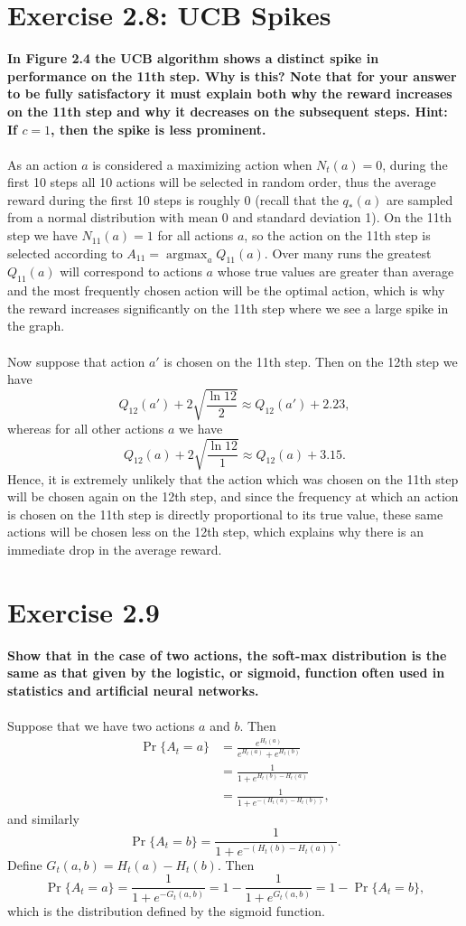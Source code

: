 \documentclass[a4paper,11pt]{article}
\numberwithin{equation}{section}
\theoremstyle{remark}
\DeclareMathOperator*{\argmax}{argmax}
\begin{document}
\section{Exercise 2.8: UCB Spikes}

\textbf{In Figure 2.4 the UCB algorithm shows a distinct spike in performance on the 11th step. Why is this? Note that for your answer to be fully satisfactory it must explain both why the reward increases on the 11th step and why it decreases on the subsequent steps. Hint: If $c = 1$, then the spike is less prominent.}
\\ \\
As an action $a$ is considered a maximizing action when $N_t(a)=0$, during the first 10 steps all 10 actions will be selected in random order, thus the average reward during the first 10 steps is roughly 0 (recall that the $q_*(a)$ are sampled from a normal distribution with mean 0 and standard deviation 1). On the 11th step we have $N_{11}(a)=1$ for all actions $a$, so the action on the 11th step is selected according to $A_{11} = \argmax_a Q_{11}(a)$. Over many runs the greatest $Q_{11}(a)$ will correspond to actions $a$ whose true values are greater than average and the most frequently chosen action will be the optimal action, which is why the reward increases significantly on the 11th step where we see a large spike in the graph.
\\ \\
Now suppose that action $a'$ is chosen on the 11th step. Then on the 12th step we have
\[
	Q_{12}(a') + 2\sqrt{\frac{\ln 12}{2}} \approx 	Q_{12}(a') + 2.23,
\]
whereas for all other actions $a$ we have
\[
Q_{12}(a) + 2\sqrt{\frac{\ln 12}{1}} \approx Q_{12}(a) + 3.15.
\]
Hence, it is extremely unlikely that the action which was chosen on the 11th step will be chosen again on the 12th step, and since the frequency at which an action is chosen on the 11th step is directly proportional to its true value, these same actions will be chosen less on the 12th step, which explains why there is an immediate drop in the average reward.


\section{Exercise 2.9}

\textbf{Show that in the case of two actions, the soft-max distribution is the same as that given by the logistic, or sigmoid, function often used in statistics and artificial neural networks.}
\\ \\
Suppose that we have two actions $a$ and $b$. Then
\begin{align*}
	\Pr\{A_t = a\} & = \frac{e^{H_t(a)}}{e^{H_t(a)} + e^{H_t(b)}} \\
				   & = \frac{1}{1 + e^{H_t(b) - H_t(a)}} \\
				   & = \frac{1}{1 + e^{-(H_t(a) - H_t(b))}},
\end{align*}
and similarly 
\[
	\Pr\{A_t = b\} = \frac{1}{1 + e^{-(H_t(b) - H_t(a))}}.
\]
Define $G_t(a, b) = H_t(a) - H_t(b)$. Then 
\[
	\Pr\{A_t = a\} = \frac{1}{1 + e^{-G_t(a, b)}} = 1 - \frac{1}{1 + e^{G_t(a, b)}}  = 1 - \Pr\{A_t = b\},   
\]
which is the distribution defined by the sigmoid function.
\end{document}
